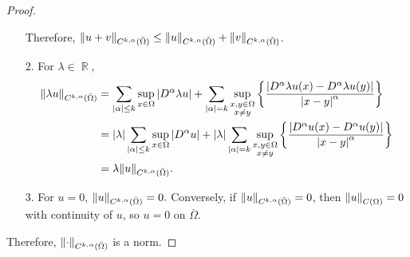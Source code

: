 \documentclass{article}
\DeclareMathOperator{\rr}{\mathbb{R}}
\begin{document}
\begin{proof}
\begin{enumerate}
\begin{equation*}
\end{equation*}
Therefore, $\norm{u+v}_{C^{k,\alpha}(\bar{\Omega})}\leq \norm{u}_{C^{k,\alpha}(\bar{\Omega})}+\norm{v}_{C^{k,\alpha}(\bar{\Omega})}$.
\item[2.] For $\lambda\in \rr$,
\begin{equation*}
\begin{split}
\norm{\lambda u}_{C^{k,\alpha}(\bar{\Omega})}&=\sum\limits_{\abs{\alpha}\leq k}\sup_{x\in \Omega}\abs{D^\alpha \lambda u}+\sum\limits_{\abs{\alpha}=k}\sup_{\substack{x,y\in \Omega \\ x\neq y}} \left\{  \frac{\abs{D^\alpha \lambda u(x)-D^\alpha \lambda u(y)}}{\abs{x-y}^\alpha}\right\} \\
&=\abs{\lambda}\sum\limits_{\abs{\alpha}\leq k}\sup_{x\in \Omega}\abs{D^\alpha  u}+\abs{\lambda}\sum\limits_{\abs{\alpha}=k}\sup_{\substack{x,y\in \Omega \\ x\neq y}} \left\{  \frac{\abs{D^\alpha  u(x)-D^\alpha  u(y)}}{\abs{x-y}^\alpha}\right\}\\
&=\lambda\norm{u}_{C^{k,\alpha}(\bar{\Omega})}.
\end{split}
\end{equation*}
\item[3.] For $u=0$, $\norm{u}_{C^{k,\alpha}(\bar{\Omega})}=0.$ Conversely, if $\norm{u}_{C^{k,\alpha}(\bar{\Omega})}=0$, then $\norm{u}_{C(\Omega)}=0$ with continuity of $u$, so $u=0$ on $\bar{\Omega}$.
\end{enumerate}
Therefore, $\norm{\cdot}_{C^{k,\alpha}(\bar{\Omega})}$ is a norm.



\end{proof}
\end{document}

